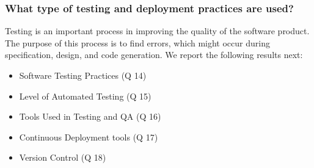 \subsubsection{What type of testing and deployment practices are used?}
\label{testing_practices}

Testing is an important process in improving the quality of the software product. The purpose of this process is to find errors, which might occur during specification, design, and code generation. We report the following results next:
\begin{itemize}
\item Software Testing Practices (Q 14)
\item Level of Automated Testing (Q 15)
\item Tools Used in Testing and QA (Q 16)
\item Continuous Deployment tools (Q 17)
\item Version Control (Q 18)
\end{itemize}


